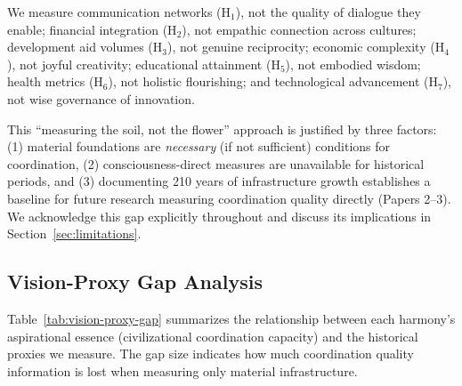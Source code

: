 \documentclass[11pt]{article}
\begin{document}
We measure communication networks (H$_1$), not the quality of dialogue they
enable; financial integration (H$_2$), not empathic connection across cultures;
development aid volumes (H$_3$), not genuine reciprocity; economic complexity
(H$_4$), not joyful creativity; educational attainment (H$_5$), not embodied
wisdom; health metrics (H$_6$), not holistic flourishing; and technological
advancement (H$_7$), not wise governance of innovation.

This ``measuring the soil, not the flower'' approach is justified by three
factors: (1) material foundations are \textit{necessary} (if not sufficient)
conditions for coordination, (2) consciousness-direct measures are unavailable
for historical periods, and (3) documenting 210 years of infrastructure growth
establishes a baseline for future research measuring coordination quality
directly (Papers 2--3). We acknowledge this gap explicitly throughout and
discuss its implications in Section~\ref{sec:limitations}.


\subsection{Vision-Proxy Gap Analysis}
\label{sec:vision-proxy-gap}

Table~\ref{tab:vision-proxy-gap} summarizes the relationship between each
harmony's aspirational essence (civilizational coordination capacity) and the
historical proxies we measure. The gap size indicates how much coordination
quality information is lost when measuring only material infrastructure.
\end{document}
